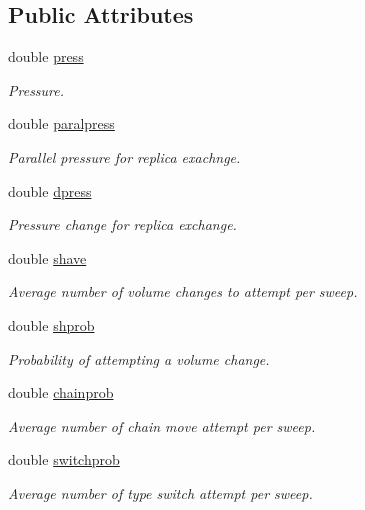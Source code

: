 \subsection*{Public Attributes}
\begin{DoxyCompactItemize}
\item 
double \hyperlink{class_sim_a2d0641585ed0c114d119b0e0a4fbafef}{press}
\begin{DoxyCompactList}\small\item\em Pressure. \end{DoxyCompactList}\item 
double \hyperlink{class_sim_a2206aa7350fdbc1cbf14190fe01882a7}{paralpress}
\begin{DoxyCompactList}\small\item\em Parallel pressure for replica exachnge. \end{DoxyCompactList}\item 
double \hyperlink{class_sim_a3932d35b63dc24ad4f11c902e2245c16}{dpress}
\begin{DoxyCompactList}\small\item\em Pressure change for replica exchange. \end{DoxyCompactList}\item 
double \hyperlink{class_sim_a9357f4ec28e50a0fab9df1536c7f4d7e}{shave}
\begin{DoxyCompactList}\small\item\em Average number of volume changes to attempt per sweep. \end{DoxyCompactList}\item 
double \hyperlink{class_sim_a65b96c98b4444057b20d47594298ccde}{shprob}
\begin{DoxyCompactList}\small\item\em Probability of attempting a volume change. \end{DoxyCompactList}\item 
double \hyperlink{class_sim_a711ff4e92fd436425a29d061973d188c}{chainprob}
\begin{DoxyCompactList}\small\item\em Average number of chain move attempt per sweep. \end{DoxyCompactList}\item 
double \hyperlink{class_sim_a71dacb1d9da362be221fa89a27dc47bc}{switchprob}
\begin{DoxyCompactList}\small\item\em Average number of type switch attempt per sweep. \end{DoxyCompactList}\item 

\end{DoxyCompactItemize}
